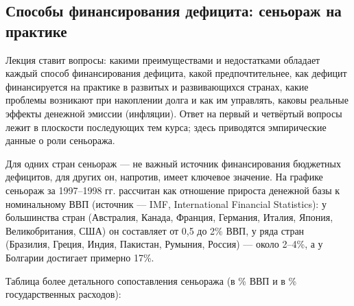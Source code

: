\documentclass[11pt,a4paper]{article}
\begin{document}
\subsection{Способы финансирования дефицита: сеньораж на практике}

Лекция ставит вопросы: какими преимуществами и недостатками обладает каждый способ финансирования дефицита, какой предпочтительнее, как дефицит финансируется на практике в развитых и развивающихся странах, какие проблемы возникают при накоплении долга и как им управлять, каковы реальные эффекты денежной эмиссии (инфляции). Ответ на первый и четвёртый вопросы лежит в плоскости последующих тем курса; здесь приводятся эмпирические данные о роли сеньоража.

Для одних стран сеньораж --- не важный источник финансирования бюджетных дефицитов, для других он, напротив, имеет ключевое значение. На графике сеньораж за 1997--1998 гг. рассчитан как отношение прироста денежной базы к номинальному ВВП (источник --- IMF, International Financial Statistics): у большинства стран (Австралия, Канада, Франция, Германия, Италия, Япония, Великобритания, США) он составляет от 0,5 до 2\% ВВП, у ряда стран (Бразилия, Греция, Индия, Пакистан, Румыния, Россия) --- около 2--4\%, а у Болгарии достигает примерно 17\%.

Таблица более детального сопоставления сеньоража (в \% ВВП и в \% государственных расходов):
\end{document}

